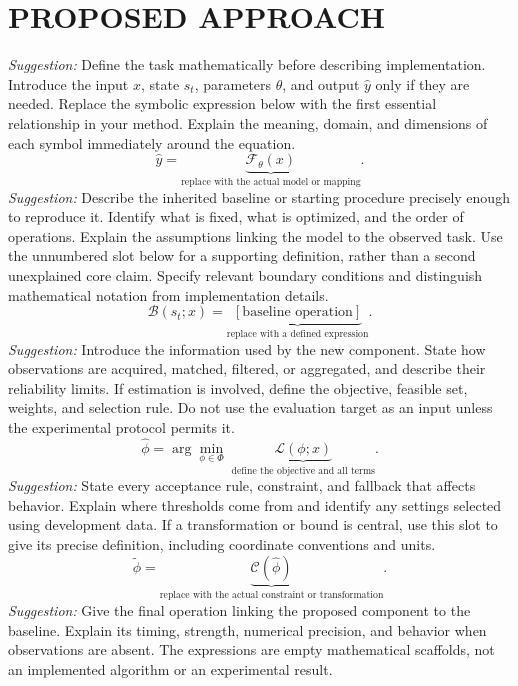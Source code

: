 \documentclass[]{spie}
\newcommand{\suggest}{\textit{Suggestion:} }
\begin{document}
\section{PROPOSED APPROACH}
\suggest Define the task mathematically before describing implementation. Introduce the input $x$, state $s_t$, parameters $\theta$, and output $\widehat y$ only if they are needed. Replace the symbolic expression below with the first essential relationship in your method. Explain the meaning, domain, and dimensions of each symbol immediately around the equation.
\begin{equation}
\widehat y = \underbrace{\mathcal F_{\theta}(x)}_{\text{replace with the actual model or mapping}}.
\label{eq:model}
\end{equation}
\suggest Describe the inherited baseline or starting procedure precisely enough to reproduce it. Identify what is fixed, what is optimized, and the order of operations. Explain the assumptions linking the model to the observed task. Use the unnumbered slot below for a supporting definition, rather than a second unexplained core claim. Specify relevant boundary conditions and distinguish mathematical notation from implementation details.
\[
\mathcal B(s_t;x)=\underbrace{[\text{baseline operation}]}_{\text{replace with a defined expression}}.
\]
\suggest Introduce the information used by the new component. State how observations are acquired, matched, filtered, or aggregated, and describe their reliability limits. If estimation is involved, define the objective, feasible set, weights, and selection rule. Do not use the evaluation target as an input unless the experimental protocol permits it.
\begin{equation}
\widehat\phi=\arg\min_{\phi\in\Phi}\;\underbrace{\mathcal L(\phi;x)}_{\text{define the objective and all terms}}.
\label{eq:objective}
\end{equation}
\suggest State every acceptance rule, constraint, and fallback that affects behavior. Explain where thresholds come from and identify any settings selected using development data. If a transformation or bound is central, use this slot to give its precise definition, including coordinate conventions and units.
\begin{equation}
\widetilde\phi=\underbrace{\mathcal C(\widehat\phi)}_{\text{replace with the actual constraint or transformation}}.
\label{eq:constraint}
\end{equation}
\suggest Give the final operation linking the proposed component to the baseline. Explain its timing, strength, numerical precision, and behavior when observations are absent. The expressions are empty mathematical scaffolds, not an implemented algorithm or an experimental result.
\end{document}
